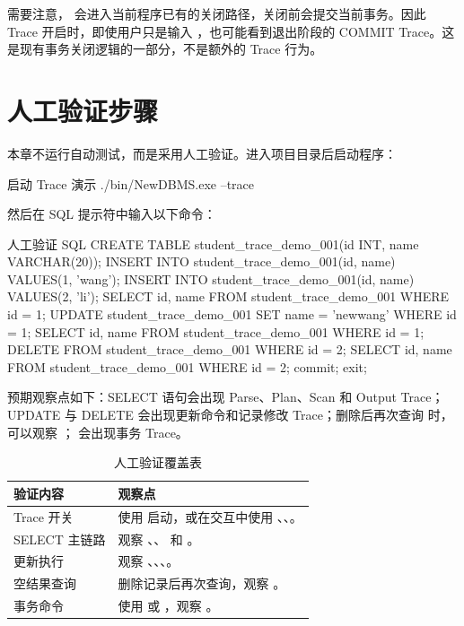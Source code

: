 需要注意， 会进入当前程序已有的关闭路径，关闭前会提交当前事务。因此 Trace 开启时，即使用户只是输入 ，也可能看到退出阶段的 COMMIT Trace。这是现有事务关闭逻辑的一部分，不是额外的 Trace 行为。

\section{人工验证步骤}
\label{sec:trace-manual-verify}

本章不运行自动测试，而是采用人工验证。进入项目目录后启动程序：

\begin{dbcode}[listing options={language=bash}]{启动 Trace 演示}
./bin/NewDBMS.exe --trace
\end{dbcode}

然后在 SQL 提示符中输入以下命令：

\begin{dbcode}[listing options={language=SQL}]{人工验证 SQL}
CREATE TABLE student_trace_demo_001(id INT, name VARCHAR(20));
INSERT INTO student_trace_demo_001(id, name) VALUES(1, 'wang');
INSERT INTO student_trace_demo_001(id, name) VALUES(2, 'li');
SELECT id, name FROM student_trace_demo_001 WHERE id = 1;
UPDATE student_trace_demo_001 SET name = 'newwang' WHERE id = 1;
SELECT id, name FROM student_trace_demo_001 WHERE id = 1;
DELETE FROM student_trace_demo_001 WHERE id = 2;
SELECT id, name FROM student_trace_demo_001 WHERE id = 2;
commit;
exit;
\end{dbcode}

预期观察点如下：SELECT 语句会出现 Parse、Plan、Scan 和 Output Trace；UPDATE 与 DELETE 会出现更新命令和记录修改 Trace；删除后再次查询  时，可以观察 ； 会出现事务 Trace。

\begin{table}[htbp]
  \centering
  \caption{人工验证覆盖表}
  \label{tab:trace-manual-coverage}
  \begin{tabularx}{\textwidth}{l Y}
    \toprule
    验证内容 & 观察点 \\
    \midrule
    Trace 开关 & 使用  启动，或在交互中使用 、、。\\
    SELECT 主链路 & 观察 、、 和 。\\
    更新执行 & 观察 、、、。\\
    空结果查询 & 删除记录后再次查询，观察 。\\
    事务命令 & 使用  或 ，观察 。\\
    \bottomrule
  \end{tabularx}
\end{table}

